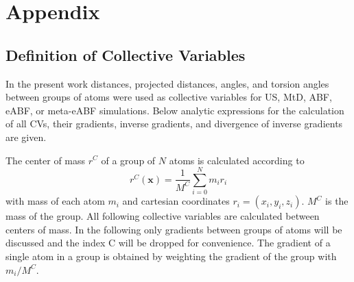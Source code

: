 \chapter{Appendix}
\label{cha:appendix}

\section{Definition of Collective Variables}
\label{sec:reaction coordinates}

In the present work distances, projected distances, angles, and torsion angles between groups of atoms were used as collective variables for US, MtD, ABF, eABF, or meta-eABF simulations.
Below analytic expressions for the calculation of all CVs, their gradients, inverse gradients, and divergence of inverse gradients are given.

The center of mass $r^C$ of a group of $N$ atoms is calculated according to
\begin{equation}
  r^C(\textbf{x}) = \frac{1}{M^C} \sum_{i=0}^N m_i r_i
\end{equation}
with mass of each atom $m_i$ and cartesian coordinates $r_i = (x_i,y_i,z_i)$. $M^C$ is the mass of the group.
All following collective variables are calculated between centers of mass. In the following only gradients between groups of atoms will be discussed and the index C will be dropped for convenience.
The gradient of a single atom in a group is obtained by weighting the gradient of the group with $m_i/M^C$.

